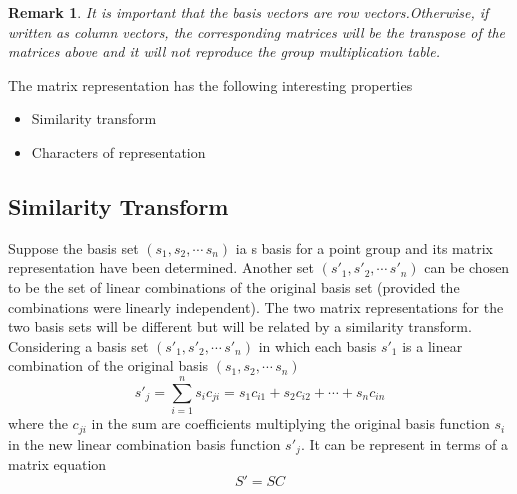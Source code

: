\documentclass[a4paper, 12pt, openany]{report}
\newtheorem{rmk}{Remark}[section]
\begin{document}
\begin{rmk}
It is important that the basis vectors are row vectors.\break  Otherwise, if written as column vectors, the corresponding matrices will be the transpose of the matrices above and it will not reproduce the group \break multiplication table.
\end{rmk}

The matrix representation has the following interesting properties
\begin{itemize}
	\item  Similarity transform
	\item Characters of representation
\end{itemize}
\subsection*{Similarity Transform}
Suppose the basis set $(s_1,s_2,\cdots\,s_n)$ ia s basis for a point group and its \break matrix representation have been determined. Another set $(s'_1,s'_2,\cdots\,s'_n)$ can be chosen to be the set of linear combinations of the original basis set \break (provided the combinations were linearly independent). The two matrix \break representations for the two basis sets will be different but will be related by a similarity transform.\\ Considering a basis set $(s'_1,s'_2,\cdots\,s'_n)$ in which each basis $s'_1$ is a linear \break combination of the original basis $(s_1,s_2,\cdots\,s_n)$ 
\begin{equation}s'_j=\sum_{i=1}^{n}s_ic_{ji}=s_1c_{i1}+s_2c_{i2}+\cdots+s_nc_{in}\end{equation}
where the $c_{ji}$ in the sum are coefficients multiplying the original basis function $s_i$ in the new linear combination basis function $s'_j$. It can be represent in terms of a matrix equation \begin{equation}\label{c}S'= SC\end{equation}
\end{document}
